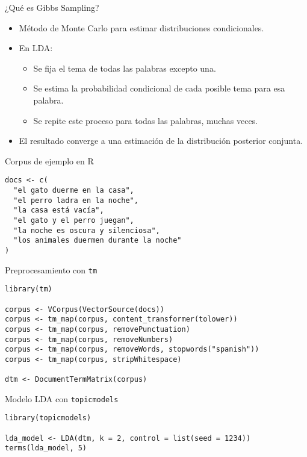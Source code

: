 \documentclass{beamer}
\begin{document}
\begin{frame}{¿Qué es Gibbs Sampling?}
  \begin{itemize}
    \item Método de Monte Carlo para estimar distribuciones condicionales.
    \item En LDA:
    \begin{itemize}
      \item Se fija el tema de todas las palabras excepto una.
      \item Se estima la probabilidad condicional de cada posible tema para esa palabra.
      \item Se repite este proceso para todas las palabras, muchas veces.
    \end{itemize}
    \item El resultado converge a una estimación de la distribución posterior conjunta.
  \end{itemize}
\end{frame}

\begin{frame}[fragile]{Corpus de ejemplo en R}
\begin{lstlisting}
docs <- c(
  "el gato duerme en la casa",
  "el perro ladra en la noche",
  "la casa está vacía",
  "el gato y el perro juegan",
  "la noche es oscura y silenciosa",
  "los animales duermen durante la noche"
)
\end{lstlisting}
\end{frame}

\begin{frame}[fragile]{Preprocesamiento con \texttt{tm}}
\begin{lstlisting}
library(tm)

corpus <- VCorpus(VectorSource(docs))
corpus <- tm_map(corpus, content_transformer(tolower))
corpus <- tm_map(corpus, removePunctuation)
corpus <- tm_map(corpus, removeNumbers)
corpus <- tm_map(corpus, removeWords, stopwords("spanish"))
corpus <- tm_map(corpus, stripWhitespace)

dtm <- DocumentTermMatrix(corpus)
\end{lstlisting}
\end{frame}

\begin{frame}[fragile]{Modelo LDA con \texttt{topicmodels}}
\begin{lstlisting}
library(topicmodels)

lda_model <- LDA(dtm, k = 2, control = list(seed = 1234))
terms(lda_model, 5)
\end{lstlisting}
\end{frame}
\end{document}
